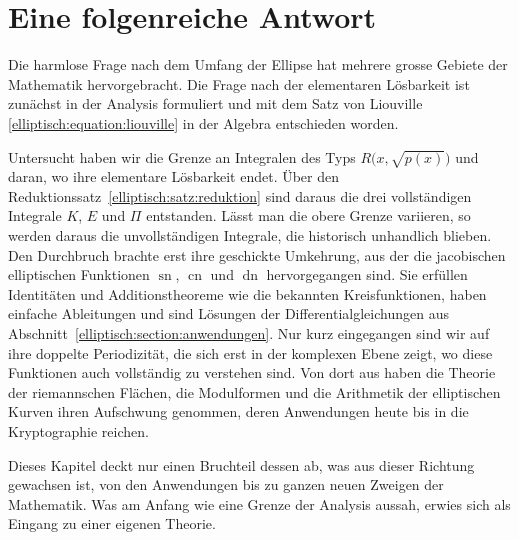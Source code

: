 %
%
%
%
\section{Eine folgenreiche Antwort
\label{elliptisch:section:schluss}}

Die harmlose Frage nach dem Umfang der Ellipse hat mehrere grosse
Gebiete der Mathematik hervorgebracht.
Die Frage nach der elementaren Lösbarkeit ist zunächst in der
Analysis formuliert und mit dem Satz von Liouville
\eqref{elliptisch:equation:liouville} in der Algebra entschieden
worden.

Untersucht haben wir die Grenze an Integralen des Typs
$R\bigl(x,\sqrt{p(x)}\bigr)$ und daran, wo ihre elementare
Lösbarkeit endet.
Über den Reduktionssatz~\ref{elliptisch:satz:reduktion} sind daraus
die drei vollständigen Integrale $K$, $E$ und $\Pi$ entstanden.
Lässt man die obere Grenze variieren, so werden daraus die
unvollständigen Integrale, die historisch unhandlich blieben.
Den Durchbruch brachte erst ihre geschickte Umkehrung, aus der die
jacobischen elliptischen Funktionen $\operatorname{sn}$,
$\operatorname{cn}$ und $\operatorname{dn}$ hervorgegangen sind.
Sie erfüllen Identitäten und Additionstheoreme wie die bekannten
Kreisfunktionen, haben einfache Ableitungen und sind Lösungen der
Differentialgleichungen aus
Abschnitt~\ref{elliptisch:section:anwendungen}.
Nur kurz eingegangen sind wir auf ihre doppelte Periodizität, die
sich erst in der komplexen Ebene zeigt, wo diese Funktionen auch
vollständig zu verstehen sind.
Von dort aus haben die Theorie der riemannschen Flächen, die
Modulformen und die Arithmetik der elliptischen Kurven ihren
Aufschwung genommen, deren Anwendungen heute bis in die
Kryptographie reichen.
%
%

Dieses Kapitel deckt nur einen Bruchteil dessen ab, was aus dieser
Richtung gewachsen ist, von den Anwendungen bis zu ganzen neuen
Zweigen der Mathematik.
Was am Anfang wie eine Grenze der Analysis aussah, erwies sich als
Eingang zu einer eigenen Theorie.
